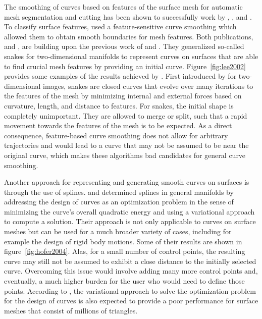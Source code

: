 \documentclass{stdlocal}
\begin{document}
The smoothing of curves based on features of the surface mesh for automatic mesh segmentation and cutting has been shown to successfully work by \textcite{jung2004}, \textcite{bischoff2005}, and \textcite{lai2007}.
To classify surface features, \textcite{lai2007} used a feature-sensitive curve smoothing which allowed them to obtain smooth boundaries for mesh features.
Both publications, \textcite{jung2004} and \textcite{bischoff2005}, are building upon the previous work of \textcite{lee2002} and \textcite{lee2004}.
They generalized so-called snakes for two-dimensional manifolds to represent curves on surfaces that are able to find crucial mesh features by providing an initial curve.
Figure~\ref{fig:lee2002} provides some examples of the results achieved by \textcite{lee2002}.
First introduced by \textcite{kass1988} for two-dimensional images, snakes are closed curves that evolve over many iterations to the features of the mesh by minimizing internal and external forces based on curvature, length, and distance to features.
For snakes, the initial shape is completely unimportant.
They are allowed to merge or split, such that a rapid movement towards the features of the mesh is to be expected.
As a direct consequence, feature-based curve smoothing does not allow for arbitrary trajectories and would lead to a curve that may not be assumed to be near the original curve, which makes these algorithms bad candidates for general curve smoothing.

Another approach for representing and generating smooth curves on surfaces is through the use of splines.
\textcite{hofer2004} and \textcite{pottmann2005} determined splines in general manifolds by addressing the design of curves as an optimization problem in the sense of minimizing the curve's overall quadratic energy and using a variational approach to compute a solution.
Their approach is not only applicable to curves on surface meshes but can be used for a much broader variety of cases, including for example the design of rigid body motions.
Some of their results are shown in figure~\ref{fig:hofer2004}.
Alas, for a small number of control points, the resulting curve may still not be assumed to exhibit a close distance to the initially selected curve.
Overcoming this issue would involve adding many more control points and, eventually, a much higher burden for the user who would need to define those points.
According to \textcite{mancinelli2022}, the variational approach to solve the optimization problem for the design of curves is also expected to provide a poor performance for surface meshes that consist of millions of triangles.
\end{document}
